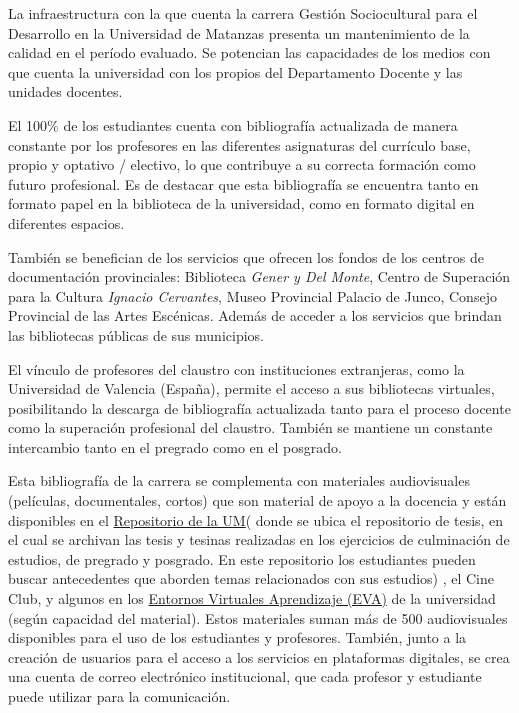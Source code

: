 La infraestructura con la que cuenta la carrera Gestión Sociocultural para el Desarrollo en la Universidad de Matanzas presenta un mantenimiento de la calidad en el período evaluado. Se potencian las capacidades de los medios con que cuenta la universidad con los propios del Departamento Docente y las unidades docentes.

El 100\% de los estudiantes cuenta con bibliografía actualizada de manera constante por los profesores en las diferentes asignaturas del currículo base, propio y optativo / electivo, lo que contribuye a su correcta formación como futuro profesional. Es de destacar que esta bibliografía se encuentra tanto en formato papel en la biblioteca de la universidad, como en formato digital en diferentes espacios.

También se benefician de los servicios que ofrecen los fondos de los centros de documentación provinciales: Biblioteca \emph{Gener y Del Monte}, Centro de Superación para la Cultura \emph{Ignacio Cervantes}, Museo Provincial Palacio de Junco, Consejo Provincial de las Artes Escénicas. Además de acceder a los servicios que brindan las bibliotecas públicas de sus municipios.

El vínculo de profesores del claustro con instituciones extranjeras, como la Universidad de Valencia (España), permite el acceso a sus bibliotecas virtuales, posibilitando la descarga de bibliografía actualizada tanto para el proceso docente como la superación profesional del claustro. También se mantiene un constante intercambio tanto en el pregrado como en el posgrado.

Esta bibliografía de la carrera se complementa con materiales audiovisuales (películas, documentales, cortos) que son material de apoyo a la docencia y están disponibles en el \href{http://rein.umcc.cu/}{Repositorio de la UM}( donde se ubica el repositorio de tesis, en el cual se archivan las tesis y tesinas realizadas en los ejercicios de culminación de estudios, de pregrado y posgrado. En este repositorio los estudiantes pueden buscar antecedentes que aborden temas relacionados con sus estudios) , el Cine Club, y algunos en los \href{https://eva.umcc.cu/}{Entornos Virtuales Aprendizaje (EVA)} de la universidad (según capacidad del material). Estos materiales suman más de 500 audiovisuales disponibles para el uso de los estudiantes y profesores. También, junto a la creación de usuarios para el acceso a los servicios en plataformas digitales, se crea una cuenta de correo electrónico institucional, que cada profesor y estudiante puede utilizar para la comunicación.

